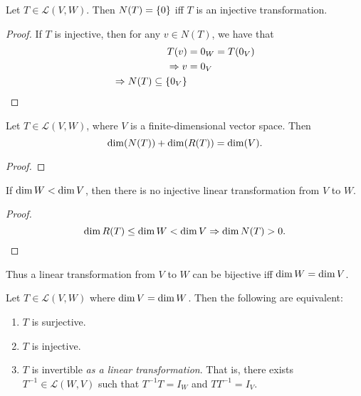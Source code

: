 
\begin{prop}[] \label{prop:}
    Let $T \in \mathscr{L}(V, W)$. Then $N(T) = \set{0}$ iff $T$ is an injective transformation.
\end{prop}
\begin{proof}
    If $T$ is injective, then for any $v \in N(T)$, we have that \begin{align*}
        T(v) &= 0_{W} = T(0_{V}) \\
        \implies v &= 0_{V} \\
        \implies N(T) \subseteq \set{0_{V}}
    \end{align*}
\end{proof}

\begin{thm} \label{thm:rank nullity}
    Let $T \in \mathscr{L}(V, W)$, where $V$ is a finite-dimensional vector space. Then \[
        \operatorname{dim}(N(T)) + \operatorname{dim}(R(T)) = \operatorname{dim}(V).
    \]
\end{thm}
\begin{proof}
\end{proof}

\begin{cor}[] \label{cor:}
    If $\operatorname{dim} W < \operatorname{dim} V$, then there is no injective linear transformation from $V$ to $W$.
\end{cor}
\begin{proof}
    \[
        \operatorname{dim} R(T) \leq \operatorname{dim} W < \operatorname{dim} V \Rightarrow \operatorname{dim} N(T) > 0. \qedhere
    \]
\end{proof}
\begin{rem}
    Thus a linear transformation from $V$ to $W$ can be bijective iff $\operatorname{dim} W = \operatorname{dim} V$.
\end{rem}

\begin{cor}[] \label{cor:}
    Let $T \in \mathscr{L}(V, W)$ where $\operatorname{dim} V = \operatorname{dim} W$. Then the following are equivalent:
    \begin{enumerate}[label=(\alph*)]
        \item $T$ is surjective.
        \item $T$ is injective.
        \item $T$ is invertible \emph{as a linear transformation}. That is, there exists $T^{-1} \in \mathscr{L}(W, V)$ such that $T^{-1}T = I_{W}$ and $TT^{-1} = I_{V}$.
    \end{enumerate}
\end{cor}

